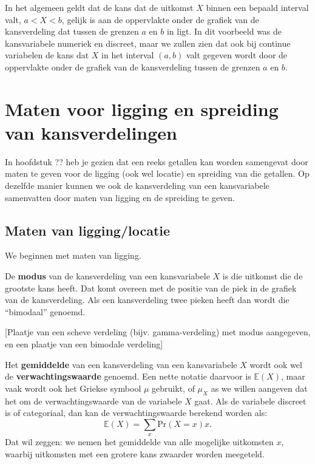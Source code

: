 \documentclass[
  a4paper,
]{scrbook}
\theoremstyle{definition}
\theoremstyle{definition}
\theoremstyle{remark}
\begin{document}
In het algemeen geldt dat de kans dat de uitkomst \(X\) binnen een
bepaald interval valt, \(a < X < b\), gelijk is aan de oppervlakte onder
de grafiek van de kansverdeling dat tussen de grenzen \(a\) en \(b\) in
ligt. In dit voorbeeld was de kansvariabele numeriek en discreet, maar
we zullen zien dat ook bij continue variabelen de kans dat \(X\) in het
interval \((a, b)\) valt gegeven wordt door de oppervlakte onder de
grafiek van de kansverdeling tussen de grenzen \(a\) en \(b\).

\section{Maten voor ligging en spreiding van
kansverdelingen}\label{maten-voor-ligging-en-spreiding-van-kansverdelingen}

In hoofdstuk ?? heb je gezien dat een reeks getallen kan worden
samengevat door maten te geven voor de ligging (ook wel locatie) en
spreiding van die getallen. Op dezelfde manier kunnen we ook de
kansverdeling van een kansvariabele samenvatten door maten van ligging
en de spreiding te geven.

\subsection{Maten van ligging/locatie}\label{maten-van-ligginglocatie}

We beginnen met maten van ligging.

De \textbf{modus} van de kansverdeling van een kansvariabele \(X\) is
die uitkomst die de grootste kans heeft. Dat komt overeen met de positie
van de piek in de grafiek van de kansverdeling. Als een kansverdeling
twee pieken heeft dan wordt die ``bimodaal'' genoemd.

{[}Plaatje van een scheve verdeling (bijv. gamma-verdeling) met modus
aangegeven, en een plaatje van een bimodale verdeling{]}

Het \textbf{gemiddelde} van een kansverdeling van een kansvariabele
\(X\) wordt ook wel de \textbf{verwachtingswaarde} genoemd. Een nette
notatie daarvoor is \(\mathbb{E}\!\left(X\right)\), maar vaak wordt ook
het Griekse symbool \(\mu\) gebruikt, of \(\mu_X\) as we willen aangeven
dat het om de verwachtingswaarde van de variabele \(X\) gaat. Als de
variabele discreet is of categoriaal, dan kan de verwachtingswaarde
berekend worden als:
\[    \mathbb{E}\!\left(X\right) = \sum_x \textrm{Pr}\!\left(X = x\right) x. \]
Dat wil zeggen: we nemen het gemiddelde van alle mogelijke uitkomsten
\(x\), waarbij uitkomsten met een grotere kans zwaarder worden
meegeteld.
\end{document}

